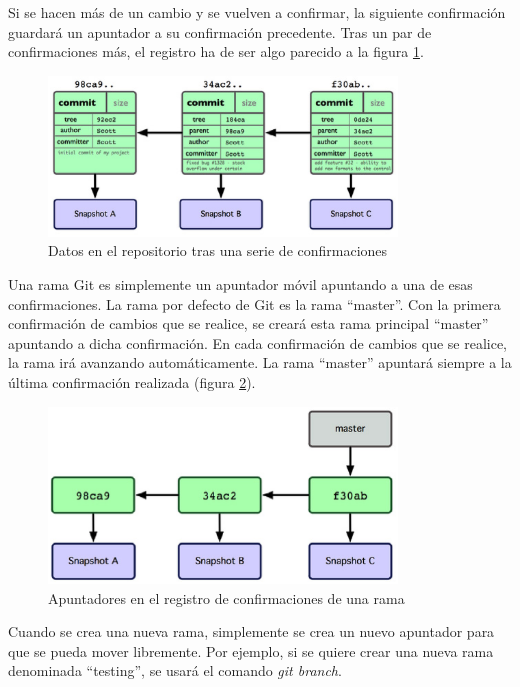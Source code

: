 Si se hacen más de un cambio y se vuelven a confirmar, la siguiente confirmación guardará un apuntador a su confirmación precedente. Tras un par de confirmaciones más, el registro ha de ser algo parecido a la figura \ref{fig:ramas_conf_serie}.

\begin{figure}
  \centering
    \includegraphics[width=350px]{./eps/git/git_datos_repositorio_serie_conf.eps}
  \caption{Datos en el repositorio tras una serie de confirmaciones}
  \label{fig:ramas_conf_serie}
\end{figure}

Una rama Git es simplemente un apuntador móvil apuntando a una de esas confirmaciones. La rama por defecto de Git es la rama ``master''. Con la primera confirmación de cambios que se realice, se creará esta rama principal ``master'' apuntando a dicha confirmación. En cada confirmación de cambios que se realice, la rama irá avanzando automáticamente. La rama ``master'' apuntará siempre a la última confirmación realizada (figura \ref{fig:ramas_apuntadores_reg}).

\begin{figure}
  \centering
    \includegraphics[width=350px]{./eps/git/git_apuntador_registro_conf_rama.eps}
  \caption{Apuntadores en el registro de confirmaciones de una rama}
  \label{fig:ramas_apuntadores_reg}
\end{figure}

Cuando se crea una nueva rama, simplemente se crea un nuevo apuntador para que se pueda mover libremente. Por ejemplo, si se quiere crear una nueva rama denominada ``testing'', se usará el comando {\it git branch}.

